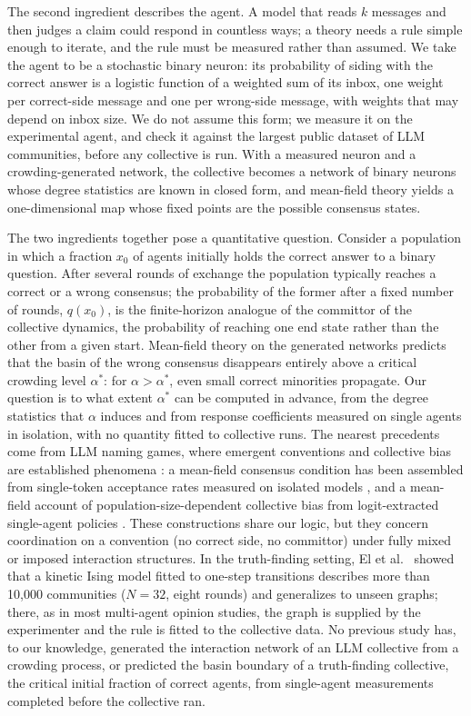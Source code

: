 \documentclass{ieeeaccess}
\newcommand{\astar}{\alpha^{*}}
\begin{document}
The second ingredient describes the agent. A model that reads $k$ messages
and then judges a claim could respond in countless ways; a theory needs a
rule simple enough to iterate, and the rule must be measured rather than
assumed. We take the agent to be a stochastic binary neuron: its probability
of siding with the correct answer is a logistic function of a weighted sum
of its inbox, one weight per correct-side message and one per wrong-side
message, with weights that may depend on inbox size. We do not assume this
form; we measure it on the experimental agent, and check it against the
largest public dataset of LLM communities, before any collective is run.
With a measured neuron and a
crowding-generated network, the collective becomes a network of binary
neurons whose degree statistics are known in closed form, and mean-field
theory yields a one-dimensional map whose fixed points are the possible
consensus states.

The two ingredients together pose a quantitative question. Consider a
population in which a fraction $x_0$ of agents initially holds the correct
answer to a binary question. After several rounds of exchange the population
typically reaches a correct or a wrong consensus; the probability of the
former after a fixed number of rounds, $q(x_0)$, is the finite-horizon
analogue of the committor of the collective dynamics, the probability of
reaching one end state rather than the other from a given start. Mean-field
theory on the generated networks predicts that the basin of the wrong
consensus disappears entirely above a critical crowding level $\astar$: for
$\alpha > \astar$, even small correct minorities propagate. Our question is
to what extent $\astar$ can be computed in advance, from the degree
statistics that $\alpha$ induces and from response coefficients measured on
single agents in isolation, with no quantity fitted to collective runs. The
nearest precedents come from LLM naming games, where emergent conventions
and collective bias are established phenomena \cite{Ashery2025, Flint2026}:
a mean-field consensus condition has been assembled from single-token
acceptance rates measured on isolated models \cite{DeNobili2026}, and a
mean-field account of population-size-dependent collective bias from
logit-extracted single-agent policies \cite{Flint2026}. These constructions
share our logic, but they concern coordination on a convention (no correct
side, no committor) under fully mixed or imposed interaction structures. In
the truth-finding setting, El et al.~\cite{El2026} showed that a kinetic Ising model
fitted to one-step transitions describes more than 10{,}000 communities
($N = 32$, eight rounds) and generalizes to unseen graphs; there, as in most
multi-agent opinion studies, the graph is supplied by the experimenter and
the rule is fitted to the collective data. No previous study has, to our
knowledge, generated the interaction network of an LLM collective from a
crowding process, or predicted the basin boundary of a truth-finding
collective, the critical initial fraction of correct agents, from
single-agent measurements completed before the collective ran.
\end{document}
